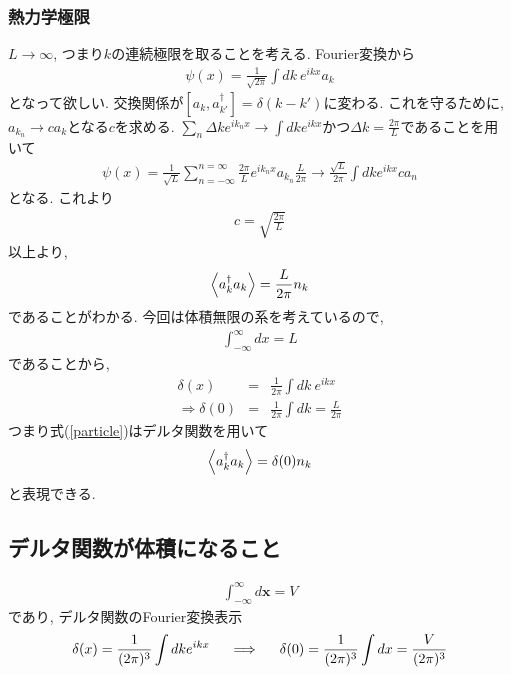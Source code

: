 \documentclass[10.5pt,a4paper]{jreport}
\begin{document}
\subsubsection{熱力学極限}
$L\rightarrow\infty$, つまり$k$の連続極限を取ることを考える. Fourier変換から
\begin{eqnarray}
  \psi(x) = \frac{1}{\sqrt{2\pi}}\int dk\ e^{ikx}a_k
\end{eqnarray}
となって欲しい. 交換関係が$[a_k, a_{k'}^\dagger] = \delta(k - k')$に変わる. これを守るために, $a_{k_n}\rightarrow ca_k$となる$c$を求める. $\sum_n\Delta ke^{ik_nx}\rightarrow\int dk e^{ikx}$かつ$\Delta k = \frac{2\pi}{L}$であることを用いて
\begin{eqnarray}
  \psi(x) = \frac{1}{\sqrt{L}}\sum_{n=-\infty}^{n=\infty}\frac{2\pi}{L}e^{ik_nx}a_{k_n}\frac{L}{2\pi}\rightarrow \frac{\sqrt{L}}{2\pi}\int dk e^{ikx} ca_n
\end{eqnarray}
となる. これより
\begin{eqnarray}
  c = \sqrt{\frac{2\pi}{L}}
\end{eqnarray}
以上より,
\begin{eqnarray}
  \expval{a_k^\dagger a_k} = \frac{L}{2\pi}n_k\label{particle}
\end{eqnarray}
であることがわかる. 今回は体積無限の系を考えているので,
\begin{eqnarray}
  \int_{-\infty}^\infty dx = L
\end{eqnarray}
であることから,
\begin{eqnarray}
  \delta(x) &=& \frac{1}{2\pi}\int dk\  e^{ikx}\\
  \Longrightarrow \delta(0) &=& \frac{1}{2\pi}\int dk = \frac{L}{2\pi}
\end{eqnarray}
つまり式(\ref{particle})はデルタ関数を用いて
\begin{eqnarray}
  \expval{a_k^\dagger a_k} = \delta(0)n_k\label{particle}
\end{eqnarray}
と表現できる.
\subsection{デルタ関数が体積になること}
\begin{eqnarray}
  \int^\infty_{-\infty} d\bm{x} = V
\end{eqnarray}
であり, デルタ関数のFourier変換表示
\begin{eqnarray}
  \delta(x) = \frac{1}{(2\pi)^3}\int dk e^{ikx}\hspace{0.5cm}\Longrightarrow \hspace{0.5cm}\delta(0) = \frac{1}{(2\pi)^3}\int dx = \frac{V}{(2\pi)^3}\label{delta-volume}
\end{eqnarray}
\end{document}
